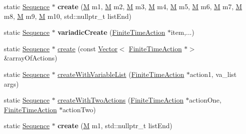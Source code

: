 \begin{DoxyCompactItemize}
\item 
\mbox{\label{classSequence_a65301e27474a3bc762ffca25ce2dfa15}} 
static \hyperlink{classSequence}{Sequence} $\ast$ {\bfseries create} (\hyperlink{classSequence_a6f34f8a978819442ffa4e9517ed49c10}{M} m1, \hyperlink{classSequence_a6f34f8a978819442ffa4e9517ed49c10}{M} m2, \hyperlink{classSequence_a6f34f8a978819442ffa4e9517ed49c10}{M} m3, \hyperlink{classSequence_a6f34f8a978819442ffa4e9517ed49c10}{M} m4, \hyperlink{classSequence_a6f34f8a978819442ffa4e9517ed49c10}{M} m5, \hyperlink{classSequence_a6f34f8a978819442ffa4e9517ed49c10}{M} m6, \hyperlink{classSequence_a6f34f8a978819442ffa4e9517ed49c10}{M} m7, \hyperlink{classSequence_a6f34f8a978819442ffa4e9517ed49c10}{M} m8, \hyperlink{classSequence_a6f34f8a978819442ffa4e9517ed49c10}{M} m9, \hyperlink{classSequence_a6f34f8a978819442ffa4e9517ed49c10}{M} m10, std\+::nullptr\+\_\+t list\+End)
\item 
\mbox{\label{classSequence_a455816708ba4e99c718bdd06eaa21c44}} 
static \hyperlink{classSequence}{Sequence} $\ast$ {\bfseries variadic\+Create} (\hyperlink{classFiniteTimeAction}{Finite\+Time\+Action} $\ast$item,...)
\item 
static \hyperlink{classSequence}{Sequence} $\ast$ \hyperlink{classSequence_a7ff3322e0f0f7a24f9d21835962b66dd}{create} (const \hyperlink{classVector}{Vector}$<$ \hyperlink{classFiniteTimeAction}{Finite\+Time\+Action} $\ast$$>$ \&array\+Of\+Actions)
\item 
static \hyperlink{classSequence}{Sequence} $\ast$ \hyperlink{classSequence_a7604201e2d9e58bdf1125defc27a1987}{create\+With\+Variable\+List} (\hyperlink{classFiniteTimeAction}{Finite\+Time\+Action} $\ast$action1, va\+\_\+list args)
\item 
static \hyperlink{classSequence}{Sequence} $\ast$ \hyperlink{classSequence_aa513abc4dc83fd38844537bf3412c0f9}{create\+With\+Two\+Actions} (\hyperlink{classFiniteTimeAction}{Finite\+Time\+Action} $\ast$action\+One, \hyperlink{classFiniteTimeAction}{Finite\+Time\+Action} $\ast$action\+Two)
\item 
\mbox{\label{classSequence_a42a76c31f0064f04e73e425cb8a68eb8}} 
static \hyperlink{classSequence}{Sequence} $\ast$ {\bfseries create} (\hyperlink{classSequence_a6f34f8a978819442ffa4e9517ed49c10}{M} m1, std\+::nullptr\+\_\+t list\+End)
\item 
\mbox{\label{classSequence_a0e505f60480c6ce8f68b9dc74e60a425}} 
$$
\end{DoxyCompactItemize}

